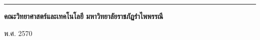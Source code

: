 \begin{center}
    \vfill
    
    {\color{rbruNavy}\rule{0.35\textwidth}{1pt}}
    \vspace{0.4cm}
    {\fontsize{13}{16}\selectfont\bfseries\color{rbruNavy} คณะวิทยาศาสตร์และเทคโนโลยี มหาวิทยาลัยราชภัฏรำไพพรรณี\par}
    {\fontsize{11}{14}\selectfont พ.ศ. 2570\par}
    \vspace{1.0cm}
\end{center}
\clearpage
